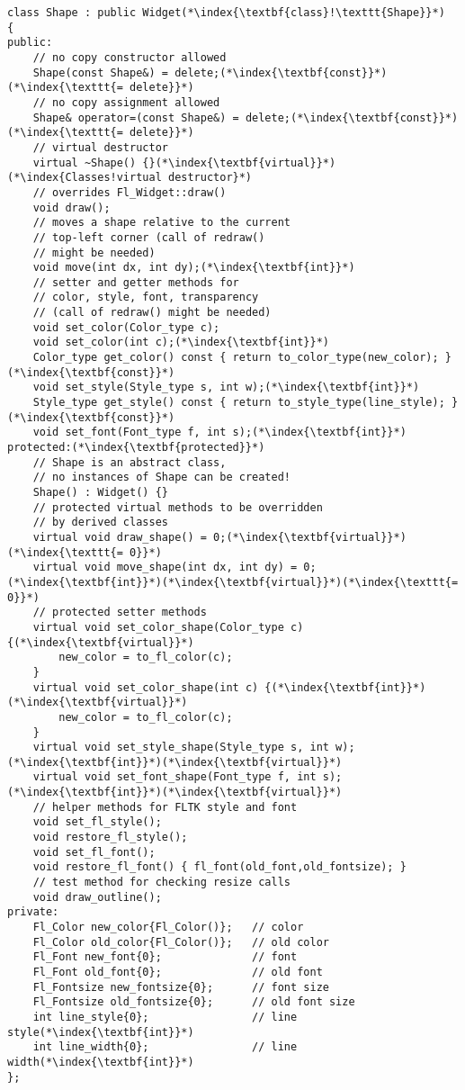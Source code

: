 \documentclass[10pt]{article}
\begin{document}
\begin{lstlisting}
class Shape : public Widget(*\index{\textbf{class}!\texttt{Shape}}*)
{
public:
    // no copy constructor allowed
    Shape(const Shape&) = delete;(*\index{\textbf{const}}*)(*\index{\texttt{= delete}}*)
    // no copy assignment allowed
    Shape& operator=(const Shape&) = delete;(*\index{\textbf{const}}*)(*\index{\texttt{= delete}}*)
    // virtual destructor
    virtual ~Shape() {}(*\index{\textbf{virtual}}*)(*\index{Classes!virtual destructor}*)
    // overrides Fl_Widget::draw()
    void draw();
    // moves a shape relative to the current
    // top-left corner (call of redraw()
    // might be needed)
    void move(int dx, int dy);(*\index{\textbf{int}}*)
    // setter and getter methods for
    // color, style, font, transparency
    // (call of redraw() might be needed)
    void set_color(Color_type c);
    void set_color(int c);(*\index{\textbf{int}}*)
    Color_type get_color() const { return to_color_type(new_color); }(*\index{\textbf{const}}*)
    void set_style(Style_type s, int w);(*\index{\textbf{int}}*)
    Style_type get_style() const { return to_style_type(line_style); }(*\index{\textbf{const}}*)
    void set_font(Font_type f, int s);(*\index{\textbf{int}}*)
protected:(*\index{\textbf{protected}}*)
    // Shape is an abstract class,
    // no instances of Shape can be created!
    Shape() : Widget() {}
    // protected virtual methods to be overridden
    // by derived classes
    virtual void draw_shape() = 0;(*\index{\textbf{virtual}}*)(*\index{\texttt{= 0}}*)
    virtual void move_shape(int dx, int dy) = 0;(*\index{\textbf{int}}*)(*\index{\textbf{virtual}}*)(*\index{\texttt{= 0}}*)
    // protected setter methods
    virtual void set_color_shape(Color_type c) {(*\index{\textbf{virtual}}*)
        new_color = to_fl_color(c);
    }
    virtual void set_color_shape(int c) {(*\index{\textbf{int}}*)(*\index{\textbf{virtual}}*)
        new_color = to_fl_color(c);
    }
    virtual void set_style_shape(Style_type s, int w);(*\index{\textbf{int}}*)(*\index{\textbf{virtual}}*)
    virtual void set_font_shape(Font_type f, int s);(*\index{\textbf{int}}*)(*\index{\textbf{virtual}}*)
    // helper methods for FLTK style and font
    void set_fl_style();
    void restore_fl_style();
    void set_fl_font();
    void restore_fl_font() { fl_font(old_font,old_fontsize); }
    // test method for checking resize calls
    void draw_outline();
private:
    Fl_Color new_color{Fl_Color()};   // color
    Fl_Color old_color{Fl_Color()};   // old color
    Fl_Font new_font{0};              // font
    Fl_Font old_font{0};              // old font
    Fl_Fontsize new_fontsize{0};      // font size
    Fl_Fontsize old_fontsize{0};      // old font size
    int line_style{0};                // line style(*\index{\textbf{int}}*)
    int line_width{0};                // line width(*\index{\textbf{int}}*)
};
\end{lstlisting}
\end{document}
